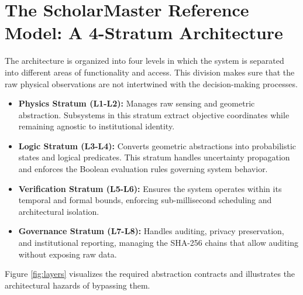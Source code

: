 \documentclass[conference]{IEEEtran}
\begin{document}
\section{The ScholarMaster Reference Model: A 4-Stratum Architecture}
The architecture is organized into four levels in which the system is separated into different areas of functionality and access. This division makes sure that the raw physical observations are not intertwined with the decision-making processes.

\begin{itemize}
    \item \textbf{Physics Stratum (L1-L2):} Manages raw sensing and geometric abstraction. Subsystems in this stratum extract objective coordinates while remaining agnostic to institutional identity.
    \item \textbf{Logic Stratum (L3-L4):} Converts geometric abstractions into probabilistic states and logical predicates. This stratum handles uncertainty propagation and enforces the Boolean evaluation rules governing system behavior.
    \item \textbf{Verification Stratum (L5-L6):} Ensures the system operates within its temporal and formal bounds, enforcing sub-millisecond scheduling and architectural isolation.
    \item \textbf{Governance Stratum (L7-L8):} Handles auditing, privacy preservation, and institutional reporting, managing the SHA-256 chains that allow auditing without exposing raw data.
\end{itemize}

Figure \ref{fig:layers} visualizes the required abstraction contracts and illustrates the architectural hazards of bypassing them. 
\end{document}
